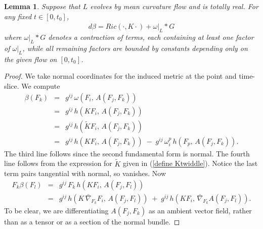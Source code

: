 \documentclass[12pt,letterpaper]{amsart}%
\newcounter{mycounter}
\numberwithin{mycounter}{section}
\theoremstyle{plain}
\newtheorem{lemma}[mycounter]{Lemma}
\numberwithin{equation}{section}
\theoremstyle{definition}
\begin{document}
\begin{lemma} Suppose that $L$ evolves by mean curvature flow and is totally real. For any fixed $t \in [0,t_0]$, \[
d\beta=\hat{R}ic(\cdot,K\cdot)+\omega|_{L}\ast G
\]
where $\omega|_L \ast G$ denotes a contraction of terms, each containing at least one factor of $\omega|_L$, while all remaining factors are bounded by constants depending only on the given flow on $[0,t_0]$.
\end{lemma}




\begin{proof}
We take normal coordinates for the induced metric at the point and time-slice. We compute
\begin{eqnarray*}
\beta(F_{k})
&=& g^{ij}\,\omega\!\left(F_{i},\,A(F_{j},F_{k})\right) \\[4pt]
&=& g^{ij}\,h\!\left(KF_{i},\,A(F_{j},F_{k})\right) \\[4pt]
&=& g^{ij}\,h\!\left(\tilde{K}F_{i},\,A(F_{j},F_{k})\right) \\[4pt]
&=& g^{ij}\,h\!\left(KF_{i},\,A(F_{j},F_{k})\right)
   \;-\;
   g^{ij}\,\omega_{i}^{p}\,
   h\!\left(F_{p},\,A(F_{j},F_{k})\right).
\end{eqnarray*}
The third line follows since the second fundamental form is normal. The fourth line follows from the expression for $\tilde{K}$ given in (\ref{define Ktwiddle}).
 Notice the last term pairs tangential with normal, so vanishes.  Now
 \begin{eqnarray*}
F_{k}\beta(F_{l})
&=& g^{ij}\,F_{k}\,h\!\left(KF_{i},\,A(F_{j},F_{l})\right) \\[6pt]
&=& g^{ij}\,h\!\left(K\,\bar{\nabla}_{F_{k}}F_{i},\,A(F_{j},F_{l})\right)
   \;+\;
   g^{ij}\,h\!\left(KF_{i},\,\bar{\nabla}_{F_{k}}A(F_{j},F_{l})\right).
\end{eqnarray*}
To be clear, we are differentiating $A(F_{j},F_{k})$ as an ambient vector field, rather than as a tensor or as a section of the normal bundle.


\end{proof}
\end{document}
